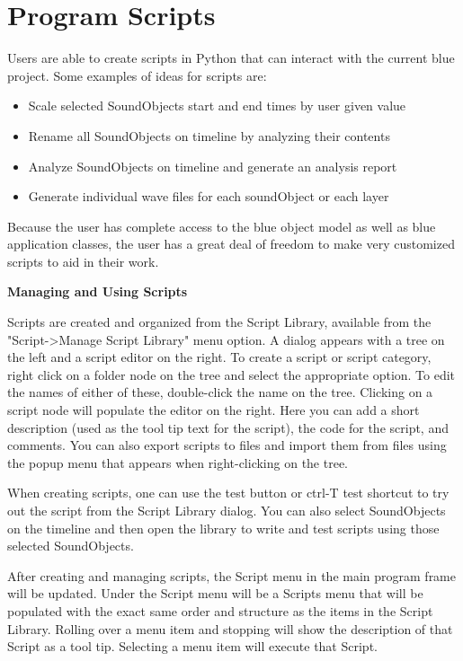 \section{Program Scripts}\label{programScripts}

Users are able to create scripts in Python that can interact with the
current blue project. Some examples of ideas for scripts are:

\begin{itemize}
\item
  Scale selected SoundObjects start and end times by user given value
\item
  Rename all SoundObjects on timeline by analyzing their contents
\item
  Analyze SoundObjects on timeline and generate an analysis report
\item
  Generate individual wave files for each soundObject or each layer
\end{itemize}

Because the user has complete access to the blue object model as well as
blue application classes, the user has a great deal of freedom to make
very customized scripts to aid in their work.

\textbf{Managing and Using Scripts}

Scripts are created and organized from the Script Library, available
from the "Script-\textgreater{}Manage Script Library" menu option. A
dialog appears with a tree on the left and a script editor on the right.
To create a script or script category, right click on a folder node on
the tree and select the appropriate option. To edit the names of either
of these, double-click the name on the tree. Clicking on a script node
will populate the editor on the right. Here you can add a short
description (used as the tool tip text for the script), the code for the
script, and comments. You can also export scripts to files and import
them from files using the popup menu that appears when right-clicking on
the tree.

When creating scripts, one can use the test button or ctrl-T test
shortcut to try out the script from the Script Library dialog. You can
also select SoundObjects on the timeline and then open the library to
write and test scripts using those selected SoundObjects.

After creating and managing scripts, the Script menu in the main program
frame will be updated. Under the Script menu will be a Scripts menu that
will be populated with the exact same order and structure as the items
in the Script Library. Rolling over a menu item and stopping will show
the description of that Script as a tool tip. Selecting a menu item will
execute that Script.

